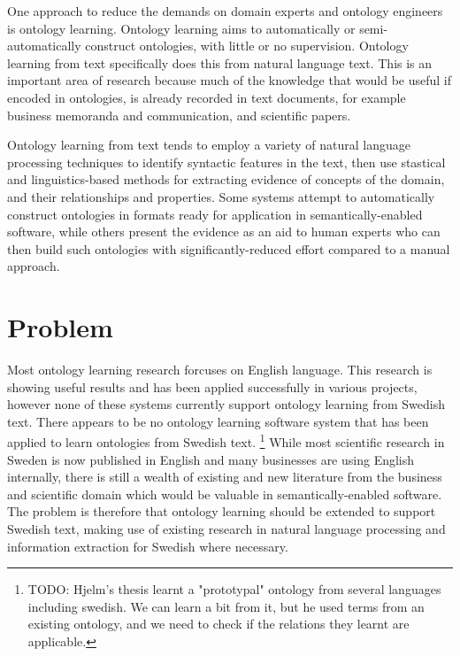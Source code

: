 \documentclass[a4paper]{report}
\newcommand{\todo}[1]{\footnote{{\color{red} TODO: #1}}}
\begin{document}
One approach to reduce the demands on domain experts and ontology engineers is ontology learning.
Ontology learning aims to automatically or semi-automatically construct ontologies, with little or no supervision.
Ontology learning from text specifically does this from natural language text.
This is an important area of research because much of the knowledge that would be useful if encoded in ontologies, is already recorded in text documents, for example business memoranda and communication, and scientific papers.

Ontology learning from text tends to employ a variety of natural language processing techniques to identify syntactic features in the text, then use stastical and linguistics-based methods for extracting evidence of concepts of the domain, and their relationships and properties.
Some systems attempt to automatically construct ontologies in formats ready for application in semantically-enabled software, while others present the evidence as an aid to human experts who can then build such ontologies with significantly-reduced effort compared to a manual approach.

\section{Problem}

Most ontology learning research forcuses on English language.
This research is showing useful results and has been applied successfully in various projects, however none of these systems currently support ontology learning from Swedish text.
There appears to be no ontology learning software system that has been applied to learn ontologies from Swedish text.
\todo{Hjelm's thesis\cite{Hjelm09Thesis} learnt a "prototypal" ontology from several languages including swedish.
We can learn a bit from it, but he used terms from an existing ontology, and we need to check if the relations they learnt are applicable.}
While most scientific research in Sweden is now published in English and many businesses are using English internally, there is still a wealth of existing and new literature from the business and scientific domain which would be valuable in semantically-enabled software.
The problem is therefore that ontology learning should be extended to support Swedish text, making use of existing research in natural language processing and information extraction for Swedish where necessary.
 
\end{document}
